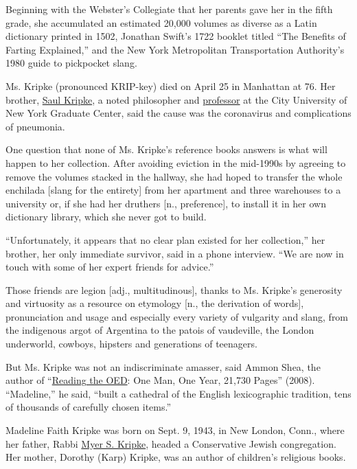 Beginning with the Webster's Collegiate that her parents gave her in the
fifth grade, she accumulated an estimated 20,000 volumes as diverse as a
Latin dictionary printed in 1502, Jonathan Swift's 1722 booklet titled
``The Benefits of Farting Explained,'' and the New York Metropolitan
Transportation Authority's 1980 guide to pickpocket slang.

Ms. Kripke (pronounced KRIP-key) died on April 25 in Manhattan at 76.
Her brother,
\href{https://www.nytimes.com/2006/01/28/books/philosopher-65-lectures-not-about-what-am-i-but-what-is-i.html}{Saul
Kripke}, a noted philosopher and
\href{https://www.britannica.com/biography/Saul-Kripke}{professor} at
the City University of New York Graduate Center, said the cause was the
coronavirus and complications of pneumonia.

One question that none of Ms. Kripke's reference books answers is what
will happen to her collection. After avoiding eviction in the mid-1990s
by agreeing to remove the volumes stacked in the hallway, she had hoped
to transfer the whole enchilada {[}slang for the entirety{]} from her
apartment and three warehouses to a university or, if she had her
druthers {[}n., preference{]}, to install it in her own dictionary
library, which she never got to build.

``Unfortunately, it appears that no clear plan existed for her
collection,'' her brother, her only immediate survivor, said in a phone
interview. ``We are now in touch with some of her expert friends for
advice.''

Those friends are legion {[}adj., multitudinous{]}, thanks to Ms.
Kripke's generosity and virtuosity as a resource on etymology {[}n., the
derivation of words{]}, pronunciation and usage and especially every
variety of vulgarity and slang, from the indigenous argot of Argentina
to the patois of vaudeville, the London underworld, cowboys, hipsters
and generations of teenagers.

But Ms. Kripke was not an indiscriminate amasser, said Ammon Shea, the
author of
``\href{https://www.nytimes.com/2008/08/03/books/review/Baker-t.html}{Reading
the OED}: One Man, One Year, 21,730 Pages'' (2008). ``Madeline,'' he
said, ``built a cathedral of the English lexicographic tradition, tens
of thousands of carefully chosen items.''

Madeline Faith Kripke was born on Sept. 9, 1943, in New London, Conn.,
where her father, Rabbi
\href{https://www.nytimes.com/2014/05/04/us/rabbi-myer-kripke-100-early-buffett-friend-and-investor-dies.html}{Myer
S. Kripke}, headed a Conservative Jewish congregation. Her mother,
Dorothy (Karp) Kripke, was an author of children's religious books.


